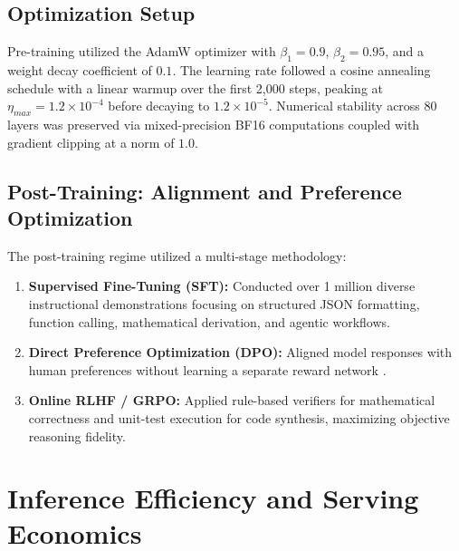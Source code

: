 \documentclass[conference]{IEEEtran}
\begin{document}
\subsection{Optimization Setup}
Pre-training utilized the AdamW optimizer with $\beta_1 = 0.9$, $\beta_2 = 0.95$, and a weight decay coefficient of $0.1$. The learning rate followed a cosine annealing schedule with a linear warmup over the first 2,000 steps, peaking at $\eta_{max} = 1.2 \times 10^{-4}$ before decaying to $1.2 \times 10^{-5}$. Numerical stability across 80 layers was preserved via mixed-precision BF16 computations coupled with gradient clipping at a norm of $1.0$.

\subsection{Post-Training: Alignment and Preference Optimization}
The post-training regime utilized a multi-stage methodology:
\begin{enumerate}
    \item \textbf{Supervised Fine-Tuning (SFT):} Conducted over 1 million diverse instructional demonstrations focusing on structured JSON formatting, function calling, mathematical derivation, and agentic workflows.
    \item \textbf{Direct Preference Optimization (DPO):} Aligned model responses with human preferences without learning a separate reward network \cite{rafailov2024direct}.
    \item \textbf{Online RLHF / GRPO:} Applied rule-based verifiers for mathematical correctness and unit-test execution for code synthesis, maximizing objective reasoning fidelity.
\end{enumerate}

\section{Inference Efficiency and Serving Economics}
\end{document}
